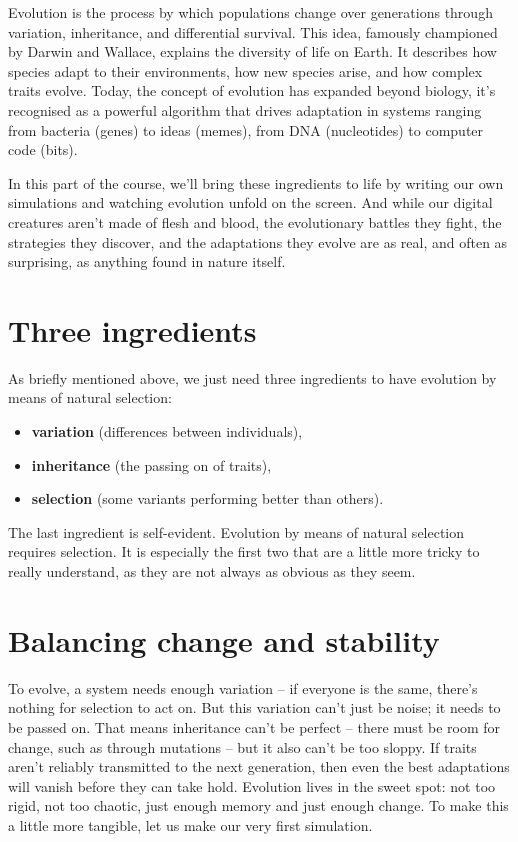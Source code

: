 \documentclass[
  letterpaper,
  DIV=11,
  numbers=noendperiod]{scrreprt}
\providecommand{\tightlist}{%
  \setlength{\itemsep}{0pt}\setlength{\parskip}{0pt}}\usepackage{longtable,booktabs,array}
\theoremstyle{definition}
\theoremstyle{remark}
\begin{document}
Evolution is the process by which populations change over generations
through variation, inheritance, and differential survival. This idea,
famously championed by Darwin and Wallace, explains the diversity of
life on Earth. It describes how species adapt to their environments, how
new species arise, and how complex traits evolve. Today, the concept of
evolution has expanded beyond biology, it's recognised as a powerful
algorithm that drives adaptation in systems ranging from bacteria
(genes) to ideas (memes), from DNA (nucleotides) to computer code
(bits).

In this part of the course, we'll bring these ingredients to life by
writing our own simulations and watching evolution unfold on the screen.
And while our digital creatures aren't made of flesh and blood, the
evolutionary battles they fight, the strategies they discover, and the
adaptations they evolve are as real, and often as surprising, as
anything found in nature itself.

\section{Three ingredients}\label{three-ingredients}

As briefly mentioned above, we just need three ingredients to have
evolution by means of natural selection:

\begin{itemize}
\tightlist
\item
  \textbf{variation} (differences between individuals),
\item
  \textbf{inheritance} (the passing on of traits),
\item
  \textbf{selection} (some variants performing better than others).
\end{itemize}

The last ingredient is self-evident. Evolution by means of natural
selection requires selection. It is especially the first two that are a
little more tricky to really understand, as they are not always as
obvious as they seem.

\section{Balancing change and
stability}\label{balancing-change-and-stability}

To evolve, a system needs enough variation -- if everyone is the same,
there's nothing for selection to act on. But this variation can't just
be noise; it needs to be passed on. That means inheritance can't be
perfect -- there must be room for change, such as through mutations --
but it also can't be too sloppy. If traits aren't reliably transmitted
to the next generation, then even the best adaptations will vanish
before they can take hold. Evolution lives in the sweet spot: not too
rigid, not too chaotic, just enough memory and just enough change. To
make this a little more tangible, let us make our very first simulation.
\end{document}
